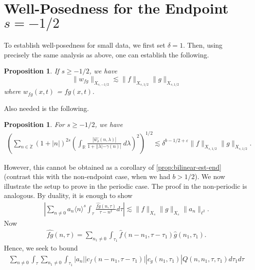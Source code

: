 \documentclass[12pt,reqno]{amsart}
\numberwithin{equation}{section}  %
\renewcommand{\cref}{\Cref}
\newcommand{\rr}{\mathbb{R}}
\newcommand{\zz}{\mathbb{Z}}
\newcommand{\zzdot}{\dot{\zz}}
\newcommand{\wh}{\widehat}
\newcommand{\ee}{\varepsilon}
\newtheorem{proposition}[theorem]{Proposition}
\begin{document}
\section{Well-Posedness for the Endpoint $s = -1/2$} 
\label{sec:}
To establish well-posedness for small data, we first set $\delta =1$. Then, using precisely the same analysis as above, one can establish the following.
\begin{proposition}
\label{prop:bilinear-est-end}
If $s \ge -1/2$, we have
\begin{equation}
\| w_{fg} \|_{X_{s,-1/2}}
\lesssim \|f\|_{X_{s,1/2}} \|g\|_{X_{s,1/2}}
\end{equation}
where $w_{fg}(x,t)$ = $fg (x,t)$.
\end{proposition}
Also needed is the following.
\begin{proposition}
For $s \ge -1/2$, we have
\begin{gather*}
\left( \sum_{n \in \zzdot} \left (1 + |n| \right )^{2s}  \left ( \int_\rr
\frac{|\wh{w_{\delta}}(n, \lambda)|}{1 + | |\lambda| - \gamma(n)|}
\ d\lambda \right )^2 \right)^{1/2} \lesssim \delta^{b-1/2 + \ee} \| f \|_{X_{s, 1/2}} \| g \|_{X_{s,1/2}}.
\end{gather*}
\label{prop:bilin-endpoint-d}
\end{proposition}
However, this cannot be obtained as a corollary of \eqref{prop:bilinear-est-end} (contrast this with the non-endpoint case, when we had $b > 1/2$). We now illustrate the setup to prove \cref{prop:bilin-endpoint-d} in the periodic case. The proof in the non-periodic is analogous. By duality, it is enough to show
\begin{equation*}
\begin{split}
| \sum_{n \neq 0} a_{n} \langle n \rangle ^{s} \int_{\tau} \frac{\wh{fg}(n, \tau)}{\tau - n^{2}} d \tau | \lesssim \| f \|_{X_{s}} \| g \|_{X_{s}} \| a_{n} \|_{\ell^{2}}.
\end{split}
\end{equation*}
Now
\begin{equation*}
\begin{split}
\wh{fg}(n, \tau) = \sum_{n_{1} \neq 0} \int_{\tau_{1}} \wh{f}(n - n_{1}, \tau - \tau_{1}) \wh{g}(n_{1}, \tau_{1}).
\end{split}
\end{equation*}
Hence, we seek to bound
\begin{equation*}
\begin{split}
\sum_{n \neq 0} \int_{\tau} \sum_{n_{1} \neq 0} \int_{\tau_{1}} | a_{n} | | c_{f}(n - n_{1}, \tau - \tau_{1}) | | c_{g}(n_{1}, \tau_{1}) | Q(n, n_{1}, \tau, \tau_{1}) d \tau_{1} d \tau
\end{split}
\end{equation*}
\end{document}
